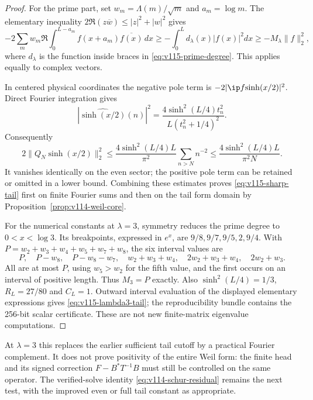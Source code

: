 \begin{proof}
For the prime part, set $w_m=\Lambda(m)/\sqrt m$ and $a_m=\log m$.
The elementary inequality $2\Re(z\overline w)\le|z|^2+|w|^2$ gives
\[
 -2\sum_m w_m\Re\int_0^{L-a_m}
      f(x+a_m)\overline{f(x)}\,dx
 \ge-\int_0^L d_\lambda(x)|f(x)|^2dx
 \ge-M_\lambda\|f\|_2^2,
\]
where $d_\lambda$ is the function inside braces in
\eqref{eq:v115-prime-degree}. This applies equally to complex vectors.

In centered physical coordinates the negative pole term is
$-2|\ip f{\sinh(x/2)}|^2$. Direct Fourier integration gives
\[
 |\widehat{\sinh(x/2)}(n)|^2
 =\frac{4\sinh^2(L/4)t_n^2}{L(t_n^2+1/4)^2}.
\]
Consequently
\[
 2\|Q_N\sinh(x/2)\|_2^2
 \le\frac{4\sinh^2(L/4)L}{\pi^2}
                         \sum_{n>N}n^{-2}
 \le\frac{4\sinh^2(L/4)L}{\pi^2N}.
\]
It vanishes identically on the even sector; the positive pole term can
be retained or omitted in a lower bound. Combining these estimates
proves \eqref{eq:v115-sharp-tail} first on finite Fourier sums and then
on the tail form domain by Proposition~\ref{prop:v114-weil-core}.

For the numerical constants at $\lambda=3$, symmetry reduces the prime
degree to $0<x<\log3$. Its breakpoints, expressed in $e^x$, are
$9/8,9/7,9/5,2,9/4$. With
$P=w_2+w_3+w_4+w_5+w_7+w_8$, the six interval values are
\[
 P,\quad P-w_8,\quad P-w_8-w_7,\quad
 w_2+w_3+w_4,\quad2w_2+w_3+w_4,\quad2w_2+w_3.
\]
All are at most $P$, using $w_5>w_2$ for the fifth value, and the first
occurs on an interval of positive length. Thus $M_3=P$ exactly.
Also $\sinh^2(L/4)=1/3$, $R_L=27/80$ and $C_L=1$.
Outward interval evaluation of the displayed elementary expressions
gives \eqref{eq:v115-lambda3-tail}; the reproducibility bundle contains
the 256-bit scalar certificate. These are not new finite-matrix
eigenvalue computations.
\end{proof}

At $\lambda=3$ this replaces the earlier sufficient tail cutoff by a
practical Fourier complement. It does not prove positivity of the
entire Weil form: the finite head and its signed correction
$F-B^*T^{-1}B$ must still be controlled on the same operator. The
verified-solve identity \eqref{eq:v114-schur-residual} remains the next
test, with the improved even or full tail constant as appropriate.
